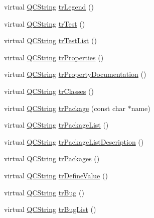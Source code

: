 \begin{DoxyCompactItemize}
\item 
virtual \mbox{\hyperlink{class_q_c_string}{Q\+C\+String}} \mbox{\hyperlink{class_translator_portuguese_ad39bbcc7ec7759ed18f439ec3eaca05e}{tr\+Legend}} ()
\item 
virtual \mbox{\hyperlink{class_q_c_string}{Q\+C\+String}} \mbox{\hyperlink{class_translator_portuguese_a7ff455cc3b1d3163ada0e1b5bd45db9e}{tr\+Test}} ()
\item 
virtual \mbox{\hyperlink{class_q_c_string}{Q\+C\+String}} \mbox{\hyperlink{class_translator_portuguese_a048a57f10f6013df5d100887c05c5182}{tr\+Test\+List}} ()
\item 
virtual \mbox{\hyperlink{class_q_c_string}{Q\+C\+String}} \mbox{\hyperlink{class_translator_portuguese_a4f71d42abef34653de236db80f1e3e26}{tr\+Properties}} ()
\item 
virtual \mbox{\hyperlink{class_q_c_string}{Q\+C\+String}} \mbox{\hyperlink{class_translator_portuguese_a681969ff269e3a713b6642f827e42de5}{tr\+Property\+Documentation}} ()
\item 
virtual \mbox{\hyperlink{class_q_c_string}{Q\+C\+String}} \mbox{\hyperlink{class_translator_portuguese_a4579f777e652d05ffd7be1e947d62c01}{tr\+Classes}} ()
\item 
virtual \mbox{\hyperlink{class_q_c_string}{Q\+C\+String}} \mbox{\hyperlink{class_translator_portuguese_aa101d0a9b7ca00a4775ac06bf7d9d402}{tr\+Package}} (const char $\ast$name)
\item 
virtual \mbox{\hyperlink{class_q_c_string}{Q\+C\+String}} \mbox{\hyperlink{class_translator_portuguese_aea85249790d42ac65ec1771a773ba46a}{tr\+Package\+List}} ()
\item 
virtual \mbox{\hyperlink{class_q_c_string}{Q\+C\+String}} \mbox{\hyperlink{class_translator_portuguese_a648632f8fd2eed89ebfb700c4d404f8a}{tr\+Package\+List\+Description}} ()
\item 
virtual \mbox{\hyperlink{class_q_c_string}{Q\+C\+String}} \mbox{\hyperlink{class_translator_portuguese_ab7d7f219b0259b7e3dd317dc997f2b61}{tr\+Packages}} ()
\item 
virtual \mbox{\hyperlink{class_q_c_string}{Q\+C\+String}} \mbox{\hyperlink{class_translator_portuguese_a8fee1ab27058583aec5d46af33a0fedc}{tr\+Define\+Value}} ()
\item 
virtual \mbox{\hyperlink{class_q_c_string}{Q\+C\+String}} \mbox{\hyperlink{class_translator_portuguese_a303704a1806264d8e02689da67dec89b}{tr\+Bug}} ()
\item 
virtual \mbox{\hyperlink{class_q_c_string}{Q\+C\+String}} \mbox{\hyperlink{class_translator_portuguese_adf2619e230b5036a337fb1e839224267}{tr\+Bug\+List}} ()

\end{DoxyCompactItemize}
